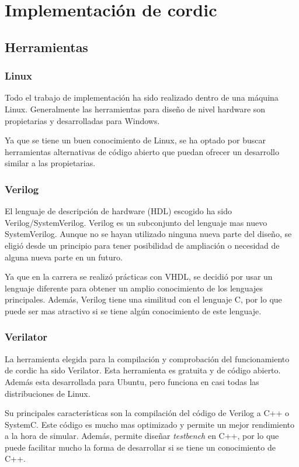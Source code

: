 \chapter{Implementación de \gls{cordic}}

\section{Herramientas}
\subsection{Linux}
Todo el trabajo de implementación ha sido realizado dentro de una máquina Linux. Generalmente las herramientas para diseño de nivel hardware son propietarias y desarrolladas para Windows.

Ya que se tiene un buen conocimiento de Linux, se ha optado por buscar herramientas alternativas de código abierto que puedan ofrecer un desarrollo similar a las propietarias.
\subsection{Verilog}
El lenguaje de descripción de hardware (HDL) escogido ha sido Verilog/SystemVerilog. Verilog es un subconjunto del lenguaje mas nuevo SystemVerilog. Aunque no se hayan utilizado ninguna nueva parte del diseño, se eligió desde un principio para tener posibilidad de ampliación o necesidad de alguna nueva parte en un futuro.

Ya que en la carrera se realizó prácticas con VHDL, se decidió por usar un lenguaje diferente para obtener un amplio conocimiento de los lenguajes principales. Además, Verilog tiene una similitud con el lenguaje C, por lo que puede ser mas atractivo si se tiene algún conocimiento de este lenguaje.

\subsection{Verilator}
La herramienta elegida para la compilación y comprobación del funcionamiento de \gls{cordic} ha sido Verilator. Esta herramienta es gratuita y de código abierto. Además esta desarrollada para Ubuntu, pero funciona en casi todas las distribuciones de Linux.

Su principales características son la compilación del código de Verilog a C++ o SystemC. Este código es mucho mas optimizado y permite un mejor rendimiento a la hora de simular. Además, permite diseñar \textit{testbench} en C++, por lo que puede facilitar mucho la forma de desarrollar si se tiene un conocimiento de C++.

